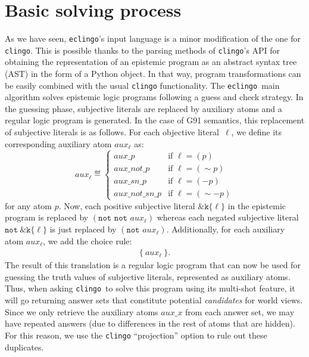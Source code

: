 \documentclass{new_tlp}
\def\eclingo{{\tt eclingo}}
\def\clingo{{\tt clingo}}
\begin{document}
\section{Basic solving process}
\label{sec:impl}
As we have seen, \eclingo's input language is a minor modification of the one for \clingo{}.
This is possible thanks to the parsing methods of \clingo's API for obtaining the representation of an epistemic program as an abstract syntax tree (AST)
in the form of a Python object.
%
In that way, program transformations can be easily combined with the usual \clingo{} functionality.
%
The \eclingo\ main algorithm solves epistemic logic programs following a guess and check strategy.
%
In the guessing phase, subjective literals are replaced by auxiliary atoms and a regular logic program is generated.
%
In the case of G91 semantics, this replacement of subjective literals is as follows.
%
For each objective literal~$\ell$, we define its corresponding auxiliary atom $\mathit{aux}_\ell$ as:
\[
\mathit{aux}_\ell \eqdef \left\{
\begin{array}{ll}
\mathit{aux}\_p & \text{if } \ell=(p) \\
\mathit{aux\_not}\_p & \text{if } \ell=(\sim p) \\
\mathit{aux\_sn}\_p & \text{if } \ell=(- p) \\
\mathit{aux\_not\_sn}\_p & \text{if } \ell=(\sim - p)
\end{array}
\right.
\]
for any atom $p$. 
%
Now, each positive subjective literal $\mathtt{\&k\{}\ell \mathtt{\}}$ in the epistemic program is replaced by $(\texttt{not\ not\ } \mathit{aux}_\ell)$ whereas each negated subjective literal $\mathtt{not \ \&k\{}\ell \mathtt{\}}$ is just replaced by $(\texttt{not\ } \mathit{aux}_\ell)$.
%
Additionally, for each auxiliary atom $\mathit{aux_\ell}$, we add the choice rule:
\begin{align*}
    \mathtt{\{}\ aux_\ell \ \mathtt{\}.}
\end{align*}
The result of this translation is a regular logic program that can now be used for guessing the truth values of subjective literals, represented as auxiliary atoms.
%
Thus, when asking \clingo\ to solve this program using its multi-shot feature, it will go returning answer sets that constitute potential \emph{candidates} for world views.
%
Since we only retrieve the auxiliary atoms $\mathit{aux\_x}$ from each answer set, we may have repeated answers (due to differences in the rest of atoms that are hidden).
%
For this reason, we use the \clingo{} ``projection'' option to rule out these duplicates.
\end{document}
